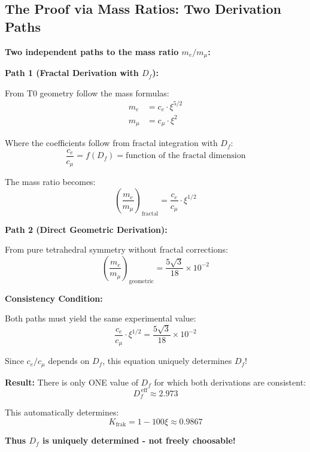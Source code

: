 	\subsection{The Proof via Mass Ratios: Two Derivation Paths}
	
	\begin{tcolorbox}[colback=red!5!white,colframe=red!75!black,title={Unique Determination of $K_{\text{frak}}$ and $D_f$}]
		\textbf{Two independent paths to the mass ratio $m_e/m_\mu$:}
		
		\textbf{Path 1 (Fractal Derivation with $D_f$):}
		
		From T0 geometry follow the mass formulas:
		\begin{align}
			m_e &= c_e \cdot \xi^{5/2} \\
			m_\mu &= c_\mu \cdot \xi^2
		\end{align}
		
		Where the coefficients follow from fractal integration with $D_f$:
		\begin{equation}
			\frac{c_e}{c_\mu} = f(D_f) = \text{function of the fractal dimension}
		\end{equation}
		
		The mass ratio becomes:
		\begin{equation}
			\left(\frac{m_e}{m_\mu}\right)_{\text{fractal}} = \frac{c_e}{c_\mu} \cdot \xi^{1/2}
		\end{equation}
		
		\textbf{Path 2 (Direct Geometric Derivation):}
		
		From pure tetrahedral symmetry without fractal corrections:
		\begin{equation}
			\left(\frac{m_e}{m_\mu}\right)_{\text{geometric}} = \frac{5\sqrt{3}}{18} \times 10^{-2}
		\end{equation}
		
		\textbf{Consistency Condition:}
		
		Both paths must yield the same experimental value:
		\begin{equation}
			\frac{c_e}{c_\mu} \cdot \xi^{1/2} = \frac{5\sqrt{3}}{18} \times 10^{-2}
		\end{equation}
		
		Since $c_e/c_\mu$ depends on $D_f$, this equation uniquely determines $D_f$!
		
		\textbf{Result:} There is only ONE value of $D_f$ for which both derivations are consistent:
		\begin{equation}
			D_f^{\,\text{eff}} \approx 2.973
		\end{equation}
		
		This automatically determines:
		\begin{equation}
			K_{\text{frak}} = 1 - 100\xi \approx 0.9867
		\end{equation}
		
		\textbf{Thus $D_f$ is uniquely determined - not freely choosable!}
	\end{tcolorbox}
	
